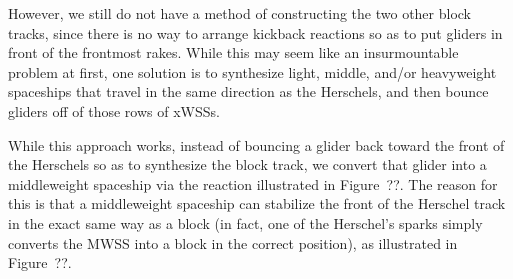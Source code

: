 However, we still do not have a method of constructing the two other block tracks, since there is no way to arrange kickback reactions so as to put gliders in front of the frontmost rakes. While this may seem like an insurmountable problem at first, one solution is to synthesize light, middle, and/or heavyweight spaceships that travel in the same direction as the Herschels, and then bounce gliders off of those rows of xWSSs.

While this approach works, instead of bouncing a glider back toward the front of the Herschels so as to synthesize the block track, we convert that glider into a middleweight spaceship via the reaction illustrated in Figure~??. The reason for this is that a middleweight spaceship can stabilize the front of the Herschel track in the exact same way as a block (in fact, one of the Herschel's sparks simply converts the MWSS into a block in the correct position), as illustrated in Figure~??.



%
%





